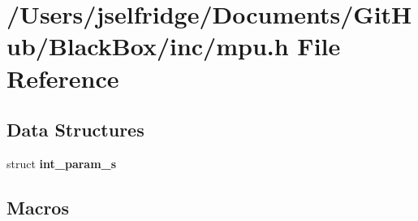 \section{/\+Users/jselfridge/\+Documents/\+Git\+Hub/\+Black\+Box/inc/mpu.h File Reference}
\label{mpu_8h}
\subsection*{Data Structures}
\begin{DoxyCompactItemize}
\item 
struct \textbf{ int\+\_\+param\+\_\+s}
\end{DoxyCompactItemize}
\subsection*{Macros}
